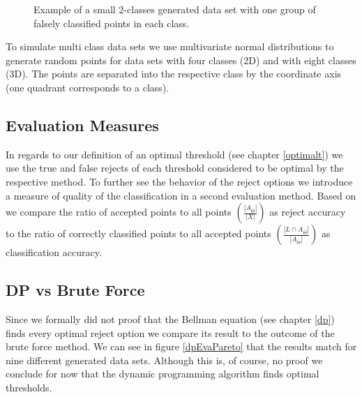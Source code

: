 \begin{figure}[!htbp]
\centering
\caption{Example of a small 2-classes generated data set with one group of falsely classified points in each class.}
\label{dataset}
\end{figure}

To simulate multi class data sets we use multivariate normal distributions to generate random points for data sets with four classes (2D) and with eight classes (3D). The points are separated into the respective class by the coordinate axis (one quadrant corresponds to a class).

\subsection{Evaluation Measures}
In regards to our definition of an optimal threshold (see chapter \ref{optimalt}) we use the true and false rejects of each threshold considered to be optimal by the respective method. To further see the behavior of the reject options we introduce a measure of quality of the classification in a second evaluation method. Based on \cite{Nad:2010} we compare the ratio of accepted points to all points $ \left( \frac{\left|A_{\bar{\Theta}}\right|}{|X|}\right) $ as reject accuracy to the ratio of correctly classified points to all accepted points $ \left(\frac{\left|L \cap A_{\bar{\Theta}}\right|}{\left|A_{\bar{\Theta}}\right|}\right) $ as classification accuracy.


\subsection{DP vs Brute Force}
\label{DPvsBF}
Since we formally did not proof that the Bellman equation (see chapter \ref{dp}) finds every optimal reject option we compare its result to the outcome of the brute force method. We can see in figure \ref{dpEvaPareto} that the results match for nine different generated data sets. Although this is, of course, no proof we conclude for now that the dynamic programming algorithm finds optimal thresholds.

